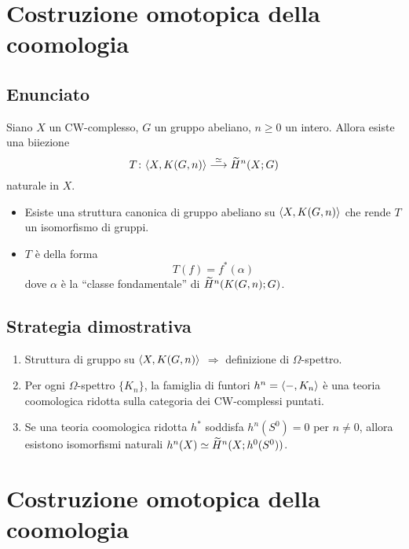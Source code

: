 \documentclass[9pt]{beamer}
\begin{document}
\newcommand*{\statemainresult}{%
\begin{theorem}
Siano $X$ un CW-complesso, $G$ un gruppo abeliano, $n\ge 0$ un intero. Allora esiste una biiezione
\[
\map[\iso]{T}{\hmaps{X,K(G,n)}}{\til{H}^n(X;G)}
\]
naturale in $X$.
\end{theorem}
}
\section*{Costruzione omotopica della coomologia}
\subsection*{Enunciato}
\begin{frame*}
\statemainresult
\begin{itemize}
\item Esiste una struttura canonica di gruppo abeliano su $\langle X,K(G,n)\rangle$ che rende $T$ un isomorfismo di gruppi.
\item $T$ è della forma
\[
T(f)=f^*(\alpha)
\]
dove $\alpha$ è la ``classe fondamentale'' di $\widetilde{H}^n(K(G,n);G)$.
\end{itemize}
\end{frame*}

\subsection*{Strategia dimostrativa}
\begin{frame*}
\begin{enumerate}
\addtolength\itemsep{1em}
\item Struttura di gruppo su $\langle X,K(G,n)\rangle$ $\Longrightarrow$ definizione di $\Omega$-spettro.
\item Per ogni $\Omega$-spettro $\{K_n\}$, la famiglia di funtori $h^n=\langle -,K_n\rangle$ è una teoria coomologica ridotta sulla categoria dei CW-complessi puntati.
\item Se una teoria coomologica ridotta $h^*$ soddisfa $h^n(S^0)=0$ per $n\neq 0$, allora esistono isomorfismi naturali $h^n(X)\simeq\widetilde{H}^n(X;h^0(S^0))$.
\end{enumerate}
\end{frame*}


%
%

\section*{Costruzione omotopica della coomologia}
\end{document}
